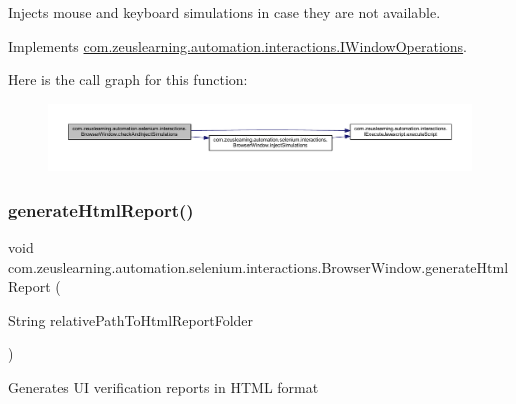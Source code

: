 Injects mouse and keyboard simulations in case they are not available. 

Implements \hyperlink{interfacecom_1_1zeuslearning_1_1automation_1_1interactions_1_1IWindowOperations_a6f5627a3145238d63f310c22d2e3c6e5}{com.\+zeuslearning.\+automation.\+interactions.\+I\+Window\+Operations}.

Here is the call graph for this function\+:
\nopagebreak
\begin{figure}[H]
\begin{center}
\leavevmode
\includegraphics[width=350pt]{d8/d87/classcom_1_1zeuslearning_1_1automation_1_1selenium_1_1interactions_1_1BrowserWindow_a501c3085d022ec5cd5ced4631c46eaae_cgraph}
\end{center}
\end{figure}
\hypertarget{classcom_1_1zeuslearning_1_1automation_1_1selenium_1_1interactions_1_1BrowserWindow_a72167c76169cf3c9b4d270da983f5036}{}\label{classcom_1_1zeuslearning_1_1automation_1_1selenium_1_1interactions_1_1BrowserWindow_a72167c76169cf3c9b4d270da983f5036} 
\subsubsection{\texorpdfstring{generate\+Html\+Report()}{generateHtmlReport()}\hspace{0.1cm}{\footnotesize\ttfamily [1/2]}}
{\footnotesize\ttfamily void com.\+zeuslearning.\+automation.\+selenium.\+interactions.\+Browser\+Window.\+generate\+Html\+Report (\begin{DoxyParamCaption}\item[{String}]{relative\+Path\+To\+Html\+Report\+Folder }\end{DoxyParamCaption})\hspace{0.3cm}{\ttfamily [inline]}}

Generates UI verification reports in H\+T\+ML format


